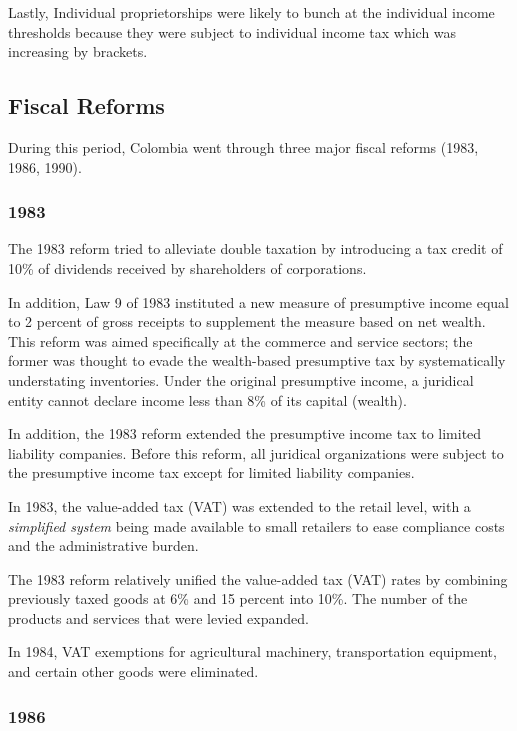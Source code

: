 \documentclass[
  12pt]{article}
\theoremstyle{definition}
\theoremstyle{remark}
\begin{document}
Lastly, Individual proprietorships were likely to bunch at the
individual income thresholds because they were subject to individual
income tax which was increasing by brackets.

\subsection{Fiscal Reforms}\label{fiscal-reforms}

During this period, Colombia went through three major fiscal reforms
(1983, 1986, 1990).

\subsubsection{1983}\label{section}

The 1983 reform tried to alleviate double taxation by introducing a tax
credit of 10\% of dividends received by shareholders of corporations.

In addition, Law 9 of 1983 instituted a new measure of presumptive
income equal to 2 percent of gross receipts to supplement the measure
based on net wealth. This reform was aimed specifically at the commerce
and service sectors; the former was thought to evade the wealth-based
presumptive tax by systematically understating inventories. Under the
original presumptive income, a juridical entity cannot declare income
less than 8\% of its capital (wealth).

In addition, the 1983 reform extended the presumptive income tax to
limited liability companies. Before this reform, all juridical
organizations were subject to the presumptive income tax except for
limited liability companies.

In 1983, the value-added tax (VAT) was extended to the retail level,
with a \emph{simplified system} being made available to small retailers
to ease compliance costs and the administrative burden.

The 1983 reform relatively unified the value-added tax (VAT) rates by
combining previously taxed goods at 6\% and 15 percent into 10\%. The
number of the products and services that were levied expanded.

In 1984, VAT exemptions for agricultural machinery, transportation
equipment, and certain other goods were eliminated.

\subsubsection{1986}\label{section-1}
\end{document}
